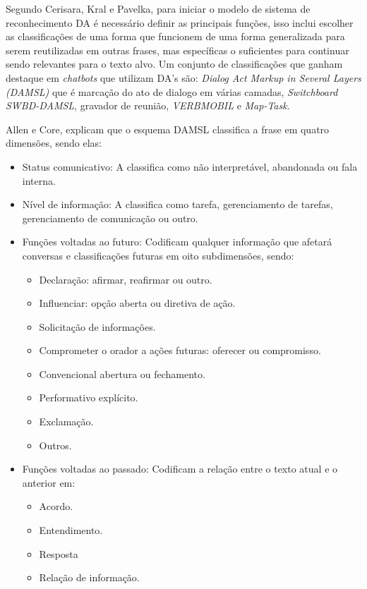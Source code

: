 \documentclass[
	12pt,				%
	oneside,
	a4paper,			%
	english,			%
	french,				%
	spanish,			%
	brazil				%
	]{abntex2}
\begin{document}
Segundo Cerisara, Kral e Pavelka\supercite{da-recognition}, para iniciar o modelo de sistema de reconhecimento DA é necessário definir as principais funções, isso inclui escolher as classificações de uma forma que funcionem de uma forma generalizada para serem reutilizadas em outras frases, mas específicas o suficientes para continuar sendo relevantes para o texto alvo. Um conjunto de classificações que ganham destaque em \emph{chatbots} que utilizam DA's são: \emph{Dialog Act Markup in Several Layers (DAMSL)} que é  marcação do ato de dialogo em várias camadas, \emph{Switchboard SWBD-DAMSL}, gravador de reunião, \emph{VERBMOBIL} e \emph{Map-Task}.

Allen e Core\supercite{damsl}, explicam que o esquema DAMSL classifica a frase em quatro dimensões, sendo elas:

\begin{itemize}
	\item 
	Status comunicativo: A classifica como não interpretável, abandonada ou fala interna.
	\item 
	Nível de informação: A classifica como tarefa, gerenciamento de tarefas, gerenciamento de comunicação ou outro.
	\item 
	Funções voltadas ao futuro: Codificam qualquer informação que afetará conversas e classificações futuras em oito subdimensões, sendo:
	\begin{itemize}
		\item Declaração: afirmar, reafirmar ou outro.
		\item Influenciar: opção aberta ou diretiva de ação.
		\item Solicitação de informações.
		\item Comprometer o orador a ações futuras: oferecer ou compromisso.
		\item Convencional abertura ou fechamento.
		\item Performativo explícito.
		\item Exclamação.
		\item Outros.
	\end{itemize}
	\item Funções voltadas ao passado: Codificam a relação entre o texto atual e o anterior em:
	\begin{itemize}
		\item Acordo.
		\item Entendimento.
		\item Resposta
		\item Relação de informação.
	\end{itemize}

\end{itemize}
\end{document}
